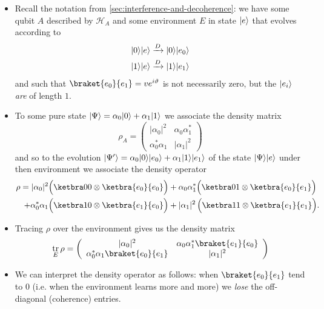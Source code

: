 \documentclass[10pt]{article}
\DeclarePairedDelimiter\ket{\lvert}{\rangle}
\newcommand{\hilb}{\mathcal{H}}
\DeclareMathOperator{\tr}{tr}
\begin{document}
                \begin{itemize}
                    \item Recall the notation from \cref{sec:interference-and-decoherence}: we have some qubit $A$ described by $\hilb_A$ and some environment $E$ in state $\ket{e}$ that evolves according to
                        \begin{align*}
                            \ket0\ket{e} &\xrightarrow{D} \ket0\ket{e_0}\\
                            \ket1\ket{e} &\xrightarrow{D} \ket1\ket{e_1}
                        \end{align*}
                        and such that $\braket{e_0}{e_1}=ve^{i\vartheta}$ is not necessarily zero, but the $\ket{e_i}$ \emph{are} of length $1$.
                    \item To some pure state $\ket\Psi=\alpha_0\ket0+\alpha_1\ket1$ we associate the density matrix
                        \begin{equation*}
                            \rho_A=\left(
                            \begin{array}{cc}
                                |\alpha_0|^2 & \alpha_0\alpha_1^*\\
                                \alpha_0^*\alpha_1 & |\alpha_1|^2
                            \end{array}
                            \right)
                        \end{equation*}
                        and so to the evolution $\ket{\Psi'}=\alpha_0\ket0\ket{e_0}+\alpha_1\ket1\ket{e_1}$ of the state $\ket\Psi\ket{e}$ under then environment we associate the density operator
                        \begin{align*}
                            \rho = |\alpha_0|^2&\Big(\ketbra00\otimes\ketbra{e_0}{e_0}\Big)+\alpha_0\alpha_1^*\Big(\ketbra01\otimes\ketbra{e_0}{e_1}\Big)\\
                            +\alpha_0^*\alpha_1&\Big(\ketbra10\otimes\ketbra{e_1}{e_0}\Big)+|\alpha_1|^2\,\Big(\ketbra11\otimes\ketbra{e_1}{e_1}\Big).
                        \end{align*}
                    \item Tracing $\rho$ over the environment gives us the density matrix
                        \begin{equation*}
                            \tr_E\rho=\left(
                            \begin{array}{cc}
                                |\alpha_0|^2 & \alpha_0\alpha_1^*\braket{e_1}{e_0}\\
                                \alpha_0^*\alpha_1\braket{e_0}{e_1} & |\alpha_1|^2
                            \end{array}
                            \right)
                        \end{equation*}
                    \item We can interpret the density operator as follows: when $\braket{e_0}{e_1}$ tend to $0$ (i.e. when the environment learns more and more) we \emph{lose} the off-diagonal (coherence) entries.
                \end{itemize}
\end{document}

